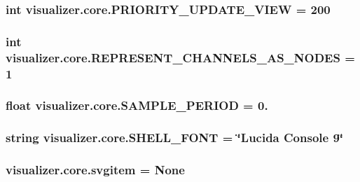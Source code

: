 \subsubsection[{\texorpdfstring{P\+R\+I\+O\+R\+I\+T\+Y\+\_\+\+U\+P\+D\+A\+T\+E\+\_\+\+V\+I\+EW}{PRIORITY_UPDATE_VIEW}}]{\setlength{\rightskip}{0pt plus 5cm}int visualizer.\+core.\+P\+R\+I\+O\+R\+I\+T\+Y\+\_\+\+U\+P\+D\+A\+T\+E\+\_\+\+V\+I\+EW = 200}\hypertarget{namespacevisualizer_1_1core_ac3b40d3d8d8cc973793368b051bd1bec}{}\label{namespacevisualizer_1_1core_ac3b40d3d8d8cc973793368b051bd1bec}
\subsubsection[{\texorpdfstring{R\+E\+P\+R\+E\+S\+E\+N\+T\+\_\+\+C\+H\+A\+N\+N\+E\+L\+S\+\_\+\+A\+S\+\_\+\+N\+O\+D\+ES}{REPRESENT_CHANNELS_AS_NODES}}]{\setlength{\rightskip}{0pt plus 5cm}int visualizer.\+core.\+R\+E\+P\+R\+E\+S\+E\+N\+T\+\_\+\+C\+H\+A\+N\+N\+E\+L\+S\+\_\+\+A\+S\+\_\+\+N\+O\+D\+ES = 1}\hypertarget{namespacevisualizer_1_1core_a54f19b9a7e648bd627e24d385cd73cc5}{}\label{namespacevisualizer_1_1core_a54f19b9a7e648bd627e24d385cd73cc5}
\subsubsection[{\texorpdfstring{S\+A\+M\+P\+L\+E\+\_\+\+P\+E\+R\+I\+OD}{SAMPLE_PERIOD}}]{\setlength{\rightskip}{0pt plus 5cm}float visualizer.\+core.\+S\+A\+M\+P\+L\+E\+\_\+\+P\+E\+R\+I\+OD = 0.}\hypertarget{namespacevisualizer_1_1core_a9f6932a07a73d9e64181d8028404c467}{}\label{namespacevisualizer_1_1core_a9f6932a07a73d9e64181d8028404c467}
\subsubsection[{\texorpdfstring{S\+H\+E\+L\+L\+\_\+\+F\+O\+NT}{SHELL_FONT}}]{\setlength{\rightskip}{0pt plus 5cm}string visualizer.\+core.\+S\+H\+E\+L\+L\+\_\+\+F\+O\+NT = \char`\"{}Lucida Console 9\char`\"{}}\hypertarget{namespacevisualizer_1_1core_affae76db4ec5f24f0a6fe88db03b550f}{}\label{namespacevisualizer_1_1core_affae76db4ec5f24f0a6fe88db03b550f}
\subsubsection[{\texorpdfstring{svgitem}{svgitem}}]{\setlength{\rightskip}{0pt plus 5cm}visualizer.\+core.\+svgitem = None}\hypertarget{namespacevisualizer_1_1core_a5174fcd2345eba943e1e702c9ccfd0b4}{}\label{namespacevisualizer_1_1core_a5174fcd2345eba943e1e702c9ccfd0b4}

